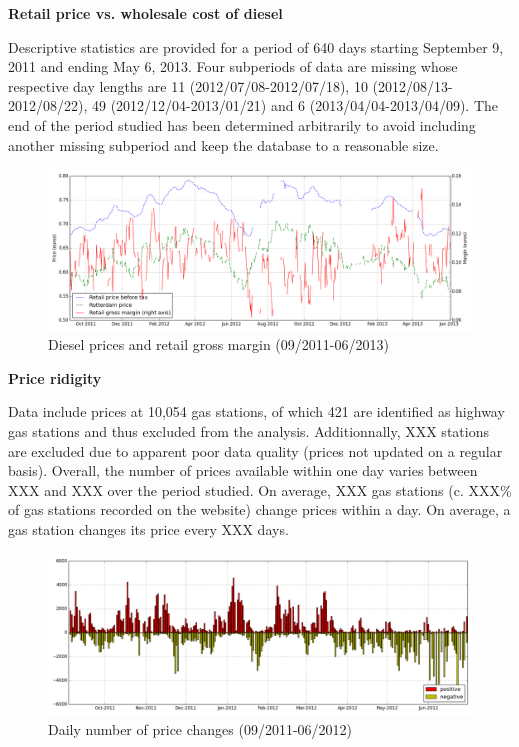 \documentclass[11pt]{article}
\begin{document}
\textbf{Retail price vs. wholesale cost of diesel}

Descriptive statistics are provided for a period of 640 days starting September 9, 2011 and ending May 6, 2013. Four subperiods of data are missing whose respective day lengths are 11 (2012/07/08-2012/07/18), 10 (2012/08/13-2012/08/22), 49 (2012/12/04-2013/01/21) and 6 (2013/04/04-2013/04/09). The end of the period studied has been determined arbitrarily to avoid including another missing subperiod and keep the database to a reasonable size.

\begin{figure}[!h]
    \caption{Diesel prices and retail gross margin (09/2011-06/2013)}
	\centering
		\includegraphics[width=16cm]{graphs/diesel_price_margin.png}
\end{figure}

\textbf{Price ridigity}

Data include prices at 10,054 gas stations, of which 421 are identified as highway gas stations and thus excluded from the analysis. Additionnally, XXX stations are excluded due to apparent poor data quality (prices not updated on a regular basis). Overall, the number of prices available within one day varies between XXX and XXX over the period studied. On average, XXX gas stations (c. XXX\% of gas stations recorded on the website) change prices within a day. On average, a gas station changes its price every XXX days.

\begin{figure}[!h]
    \caption{Daily number of price changes (09/2011-06/2012)}
	\centering
		\includegraphics[width=16cm]{graphs/diesel_nb_price_chges.png}
\end{figure}
\end{document}
